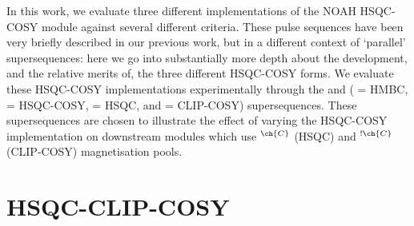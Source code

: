 \documentclass[a4paper,12pt]{article}
\newcommand{\magn}[1]{\ch{^1H}$^{\ch{#1}}$}
\newcommand{\magnnot}[1]{\ch{^1H}$^{!\ch{#1}}$}
\begin{document}
\begin{refsection}
In this work, we evaluate three different implementations of the NOAH HSQC-COSY module against several different criteria.
These pulse sequences have been very briefly described in our previous work, but in a different context of `parallel' supersequences\autocite{Kupce2021JACSA}: here we go into substantially more depth about the development, and the relative merits of, the three different HSQC-COSY forms.
We evaluate these HSQC-COSY implementations experimentally through the  and  ( = HMBC,  = HSQC-COSY,  = HSQC, and  = CLIP-COSY) supersequences.
These supersequences are chosen to illustrate the effect of varying the HSQC-COSY implementation on downstream modules which use \magn{C} (HSQC) and \magnnot{C} (CLIP-COSY) magnetisation pools.


\section{HSQC-CLIP-COSY}


\end{refsection}
\end{document}
